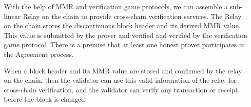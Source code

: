 With the help of MMR and verification game protocols, we can assemble a sub-linear Relay on the chain to provide cross-chain verification services. The Relay on the chain stores the discontinuous block header and its derived MMR value. This value is submitted by the prover and verified and verified by the verification game protocol. There is a premise that at least one honest prover participates in the Agreement process.

When a block header and its MMR value are stored and confirmed by the relay on the chain, then the validator can use this valid information of the relay for cross-chain verification, and the validator can verify any transaction or receipt before the block is changed. 

